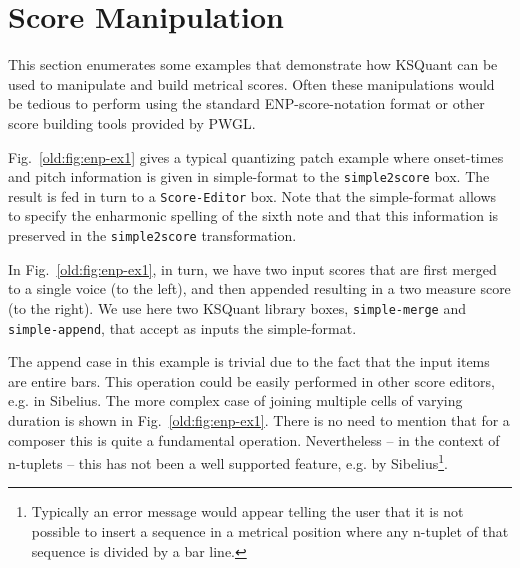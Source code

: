 \documentclass[runningheads,a4paper]{llncs}
\begin{document}


\section{Score Manipulation}\label{old:Score Manipulation}
This section enumerates some examples that demonstrate how KSQuant
can be used to manipulate and build metrical scores. Often these
manipulations would be tedious to perform using the standard
ENP-score-notation format or other score building tools provided by
PWGL.

Fig.~\ref{old:fig:enp-ex1} gives a typical quantizing patch example where
onset-times and pitch information is given in simple-format to the
\texttt{simple2score} box. The result is fed in turn to a
\texttt{Score-Editor} box. Note that the simple-format allows to
specify the enharmonic spelling of the sixth note and that this
information is preserved in the \texttt{simple2score} transformation.


In Fig.~\ref{old:fig:enp-ex1}, in turn, we have two input scores that are first merged to
a single voice (to the left), and then appended resulting in a two
measure score (to the right). We use here two KSQuant library boxes,
\texttt{simple-merge} and \texttt{simple-append}, that accept as
inputs the simple-format.

The append case in this example is trivial due to the fact that the
input items are entire bars. This operation could be easily performed
in other score editors, e.g. in Sibelius\cite{agon}. The more
complex case of joining multiple cells of varying duration is shown in
Fig.~\ref{old:fig:enp-ex1}. There is no need to mention that for a composer
this is quite a fundamental operation. Nevertheless -- in the context
of n-tuplets -- this has not been a well supported feature, e.g. by
Sibelius\footnote{Typically an error message would appear telling the
  user that it is not possible to insert a sequence in a metrical
  position where any n-tuplet of that sequence is divided by a
  bar line.}.
\end{document}

